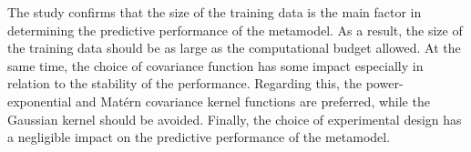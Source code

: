 The study confirms that the size of the training data is the main factor in determining the predictive performance of the metamodel.
As a result, the size of the training data should be as large as the computational budget allowed.
At the same time, the choice of covariance function has some impact especially in relation to the stability of the performance.
Regarding this, the power-exponential and Mat\'ern covariance kernel functions are preferred,
while the Gaussian kernel should be avoided.
Finally,
the choice of experimental design has a negligible impact on the predictive performance of the metamodel.
